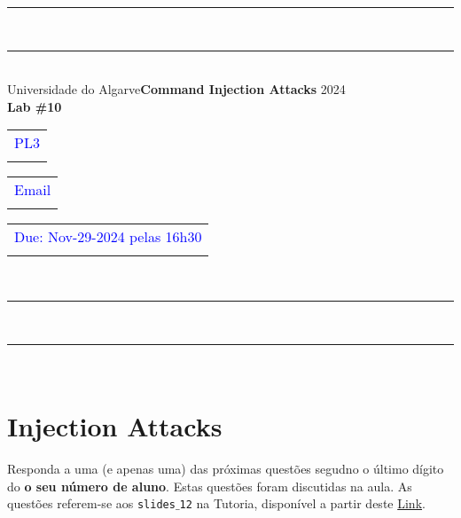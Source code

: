 \documentclass{article}
\begin{document}
\begin{center}
\rule{\textwidth}{.0075in} \\
\rule[3mm]{\textwidth}{.0075in}\\

Universidade do Algarve\hfill \textbf{Command Injection Attacks} \hfill 2024\\[3ex]

{\Large\bf Lab \#10} \\[3ex]

\begin{tabular}{l}
\textcolor{blue}{PL3} \\ \hfill 
\end{tabular}
\begin{tabular}{l}
\textcolor{blue}{Email} \\ \hfill 
\end{tabular}
\begin{tabular}{l}
\textcolor{blue}{Due: Nov-29-2024 pelas 16h30} \\ \hfill 
\end{tabular}\\

\rule{\textwidth}{.0075in} \\
\rule[3mm]{\textwidth}{.0075in} \\
\end{center}

\section*{Injection Attacks}
Responda a uma (e apenas uma) das próximas questões segudno o último dígito do \textbf{o
  seu número de aluno}. Estas questões foram discutidas na aula. As questões referem-se
aos \texttt{slides$\_$12} na Tutoria, disponível a partir deste
\href{https://tutoria.ualg.pt/2024/pluginfile.php/185066/mod_resource/content/2/redes_sem12_websec.pdf}{Link}.
\end{document}
